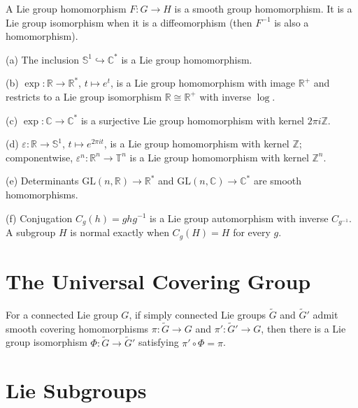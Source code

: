 \begin{definition}
\label{def:7-47-extra-1}
\leanok
A Lie group homomorphism $F:G\to H$ is a smooth group homomorphism. It is a Lie group isomorphism when it is a diffeomorphism (then $F^{-1}$ is also a homomorphism).
\end{definition}

\begin{example}
\label{ex:7-4}
\mathlibok
{}
(a) The inclusion $\mathbb S^1\hookrightarrow\mathbb C^*$ is a Lie group homomorphism.

(b) $\exp:\mathbb R\to\mathbb R^*$, $t\mapsto e^t$, is a Lie group
homomorphism with image $\mathbb R^+$ and restricts to a Lie group isomorphism
$\mathbb R\cong\mathbb R^+$ with inverse $\log$.

(c) $\exp:\mathbb C\to\mathbb C^*$ is a surjective Lie group homomorphism with
kernel $2\pi i\mathbb Z$.

(d) $\varepsilon:\mathbb R\to\mathbb S^1$, $t\mapsto e^{2\pi it}$, is a Lie
group homomorphism with kernel $\mathbb Z$; componentwise,
$\varepsilon^n:\mathbb R^n\to\mathbb T^n$ is a Lie group homomorphism with
kernel $\mathbb Z^n$.

(e) Determinants $\mathrm{GL}(n,\mathbb R)\to\mathbb R^*$ and $\mathrm{GL}(n,\mathbb C)\to\mathbb C^*$ are smooth homomorphisms.

(f) Conjugation $C_g(h)=ghg^{-1}$ is a Lie group automorphism with inverse $C_{g^{-1}}$. A subgroup $H$ is normal exactly when $C_g(H)=H$ for every $g$.
\end{example}

\section{The Universal Covering Group}


\begin{theorem}
\label{thm:7-9}
\leanok
{}
For a connected Lie group $G$, if simply connected Lie groups $\widetilde G$ and $\widetilde G'$ admit smooth covering homomorphisms $\pi:\widetilde G\to G$ and $\pi':\widetilde G'\to G$, then there is a Lie group isomorphism $\Phi:\widetilde G\to\widetilde G'$ satisfying $\pi'\circ\Phi=\pi$.
\end{theorem}

\section{Lie Subgroups}

